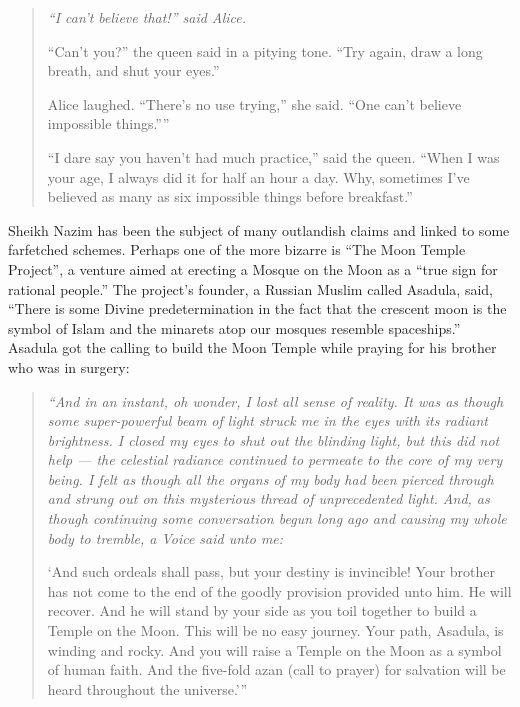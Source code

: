 \documentclass[12pt]{memoir}
\begin{document}
\begin{quote}
\itshape
“I can’t believe that!” said Alice.

“Can’t you?” the queen said in a pitying tone.
“Try again, draw a long breath, and shut your eyes.”

Alice laughed. “There’s no use trying,” she said.
“One can’t believe impossible things.”''

“I dare say you haven’t had much practice,” said the queen.
“When I was your age, I always did it for half an hour a day.
Why, sometimes I’ve believed as many as six impossible things
before breakfast.”
\end{quote}

Sheikh Nazim has been the subject of many outlandish claims
and linked to some far\–fetched schemes.
Perhaps one of the more bizarre is “The Moon Temple Project”,
a venture aimed at erecting a Mosque on the Moon
as a “true sign for rational people.”
The project’s founder, a Russian Muslim called Asadula, said,
“There is some Divine predetermination in the fact
that the crescent moon is the symbol of Islam
and the minarets atop our mosques resemble spaceships.”
Asadula got the calling to build the Moon Temple
while praying for his brother who was in surgery:

\begin{quote}
\itshape
“And in an instant, oh wonder, I lost all sense of reality.
It was as though some super-powerful beam of light struck me in the eyes
with its radiant brightness.
I closed my eyes to shut out the blinding light, but this did not help —
the celestial radiance continued to permeate to the core of my very being.
I felt as though all the organs of my body had been pierced through
and strung out on this mysterious thread of unprecedented light.
And, as though continuing some conversation begun long ago
and causing my whole body to tremble, a Voice said unto me:

‘And such ordeals shall pass, but your destiny is invincible!
Your brother has not come to the end
of the goodly provision provided unto him.
He will recover.
And he will stand by your side as you toil together
to build a Temple on the Moon.
This will be no easy journey.
Your path, Asadula, is winding and rocky.
And you will raise a Temple on the Moon as a symbol of human faith.
And the five-fold azan (call to prayer) for salvation
will be heard throughout the universe.’”
\end{quote}
\end{document}
